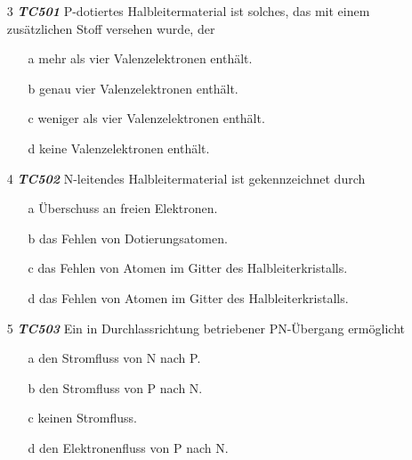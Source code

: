 \begin{enumerate}
\item[3] \emph{\textbf{TC501}}    P-dotiertes Halbleitermaterial ist solches, das mit einem zusätzlichen Stoff versehen wurde, der
	\begin{enumerate}
	\itemsep1pt\parskip0pt
		\item[a] mehr als vier Valenzelektronen enthält.
		\item[b] genau vier Valenzelektronen enthält.
		\item[c] weniger als vier Valenzelektronen enthält.
		\item[d] keine Valenzelektronen enthält.
	\end{enumerate}
\end{enumerate}


\begin{enumerate}
\item[4] \emph{\textbf{TC502}}   N-leitendes Halbleitermaterial ist gekennzeichnet durch
	\begin{enumerate}
	\itemsep1pt\parskip0pt
		\item[a] Überschuss an freien Elektronen.
		\item[b] das Fehlen von Dotierungsatomen.
		\item[c] das Fehlen von Atomen im Gitter des Halbleiterkristalls.
		\item[d] das Fehlen von Atomen im Gitter des Halbleiterkristalls.
	\end{enumerate}
\end{enumerate}


\begin{enumerate}
\item[5] \emph{\textbf{TC503}}  Ein in Durchlassrichtung betriebener PN-Übergang ermöglicht
	\begin{enumerate}
	\itemsep1pt\parskip0pt
		\item[a] den Stromfluss von N nach P.
		\item[b] den Stromfluss von P nach N.
		\item[c] keinen Stromfluss.
		\item[d] den Elektronenfluss von P nach N.
	\end{enumerate}
\end{enumerate}





